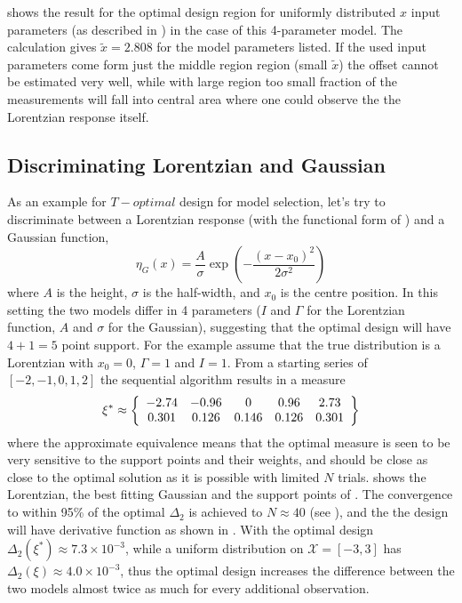 \documentclass[12pt]{iopart}
\begin{document}
 shows the result for the optimal design region for uniformly distributed $x$ input parameters (as described in ) in the case of this 4-parameter model. The calculation gives $\tilde x = 2.808$ for the model parameters listed. If the used input parameters come form just the middle region region (small $\tilde x$) the offset cannot be estimated very well, while with large region too small fraction of the measurements will fall into central area where one could observe the the Lorentzian response itself.

\subsection{Discriminating Lorentzian and Gaussian}

As an example for $T-optimal$ design for model selection, let's try to discriminate between a Lorentzian response (with the functional form of ) and a Gaussian function,
\begin{equation}
\eta_G(x) = \frac{A}{\sigma} \exp\left(-\frac{(x-x_0)^2}{2 \sigma^2}\right)
\label{eq:gauss}
\end{equation}
where $A$ is the height, $\sigma$ is the half-width, and $x_0$ is the centre position. In this setting the two models differ in 4 parameters ($I$ and $\Gamma$ for the Lorentzian function, $A$ and $\sigma$ for the Gaussian), suggesting that the optimal design will have $4+1=5$ point support. For the example assume that the true distribution is a Lorentzian with $x_0 = 0$, $\Gamma = 1$  and $I = 1$. From a starting series of $[-2, -1, 0, 1, 2]$ the sequential algorithm results in a measure
\begin{equation}
\xi^* \approx \left\{
  \begin{array}{c c c c c}
    -2.74 & -0.96 & 0 & 0.96 & 2.73\\
    0.301 & 0.126 & 0.146 & 0.126 & 0.301\\
  \end{array} \right \}
\label{eq:lorgauss}
\end{equation}
where the approximate equivalence means that the optimal measure is seen to be very sensitive to the support points and their weights, and  should be close as close to the optimal solution as it is possible with limited $N$ trials.  shows the Lorentzian, the best fitting Gaussian and the support points of . The convergence to within 95\% of the optimal $\Delta_2$ is achieved to $N \approx 40$ (see ), and the the design will have derivative function as shown in .
With the optimal design $\Delta_2(\xi^*) \approx 7.3 \times 10^{-3}$, while a uniform distribution on $\mathcal{X} = [-3, 3]$ has $\Delta_2(\xi) \approx 4.0 \times 10^{-3}$, thus the optimal design increases the difference between the two models almost twice as much for every additional observation.
\end{document}

